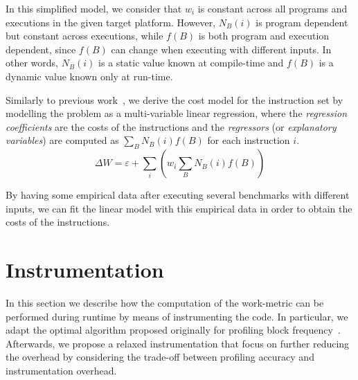 \documentclass[sigplan,10pt]{acmart}
\begin{document}
In this simplified model, we consider that $w_i$ is constant across all programs and executions in the given target platform.
However, $N_B(i)$ is program dependent but constant across executions, while $f(B)$ is both program and execution dependent, since $f(B)$ can change when executing with different inputs.
In other words, $N_B(i)$ is a static value known at compile-time and $f(B)$ is a dynamic value known only at run-time.

%

Similarly to previous work~\cite{giusto01,powell09,brandolese11}, we derive the cost model for the instruction set by modelling the problem as a multi-variable linear regression, where the \textit{regression coefficients} are the costs of the instructions and the \textit{regressors} (or \textit{explanatory variables}) are computed as $\sum_B N_B(i)f(B)$ for each instruction $i$.
\[
\Delta W = \varepsilon + \sum_{i} \left(w_i \sum_{B} N_B(i)f(B)\right)
\]

By having some empirical data after executing several benchmarks with different inputs, we can fit the linear model with this empirical data in order to obtain the costs of the instructions.

\section{Instrumentation}

In this section we describe how the computation of the work-metric can be performed during runtime by means of instrumenting the code.
In particular, we adapt the optimal algorithm proposed originally for profiling block frequency~\cite{knuth73,ball94}.
Afterwards, we propose a relaxed instrumentation that focus on further reducing the overhead by considering the trade-off between profiling accuracy and instrumentation overhead.
\end{document}
